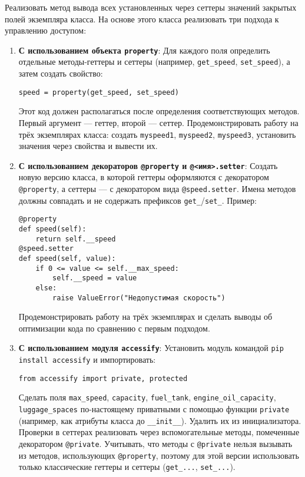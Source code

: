 \begin{enumerate}
\begin{itemize}
\end{itemize}
Реализовать метод вывода всех установленных через сеттеры значений закрытых полей экземпляра класса.
На основе этого класса реализовать три подхода к управлению доступом:
\begin{enumerate}
    \item \textbf{С использованием объекта \texttt{property}}:  
    Для каждого поля определить отдельные методы-геттеры и сеттеры (например, \texttt{get\_speed}, \texttt{set\_speed}), а затем создать свойство:  
    \begin{verbatim}
speed = property(get_speed, set_speed)
    \end{verbatim}  
    Этот код должен располагаться после определения соответствующих методов. Первый аргумент — геттер, второй — сеттер.  
    Продемонстрировать работу на трёх экземплярах класса: создать \texttt{myspeed1}, \texttt{myspeed2}, \texttt{myspeed3}, установить значения через свойства и вывести их.
    \item \textbf{С использованием декораторов \texttt{@property} и \texttt{@<имя>.setter}}:  
    Создать новую версию класса, в которой геттеры оформляются с декоратором \texttt{@property}, а сеттеры — с декоратором вида \texttt{@speed.setter}. Имена методов должны совпадать и не содержать префиксов \texttt{get\_}/\texttt{set\_}.  
    Пример:  
    \begin{verbatim}
@property
def speed(self):
    return self.__speed
@speed.setter
def speed(self, value):
    if 0 <= value <= self.__max_speed:
        self.__speed = value
    else:
        raise ValueError("Недопустимая скорость")
    \end{verbatim}  
    Продемонстрировать работу на трёх экземплярах и сделать выводы об оптимизации кода по сравнению с первым подходом.
    \item \textbf{С использованием модуля \texttt{accessify}}:  
    Установить модуль командой \texttt{pip install accessify} и импортировать:  
    \begin{verbatim}
from accessify import private, protected
    \end{verbatim}  
    Сделать поля \texttt{max\_speed}, \texttt{capacity}, \texttt{fuel\_tank}, \texttt{engine\_oil\_capacity}, \texttt{luggage\_spaces} по-настоящему приватными с помощью функции \texttt{private} (например, как атрибуты класса до \texttt{\_\_init\_\_}). Удалить их из инициализатора.  
    Проверки в сеттерах реализовать через вспомогательные методы, помеченные декоратором \texttt{@private}.  
    Учитывать, что методы с \texttt{@private} нельзя вызывать из методов, использующих \texttt{@property}, поэтому для этой версии использовать только классические геттеры и сеттеры (\texttt{get\_...}, \texttt{set\_...}).  

\end{enumerate}
\end{enumerate}
